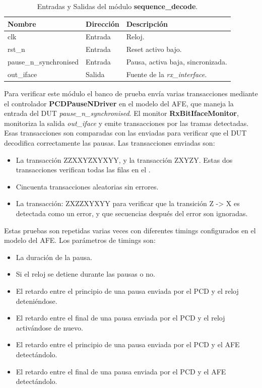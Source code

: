 \documentclass[a4paper, twoside, 11pt]{report}
\begin{document}
\begin{table}[htb]
  \centering
  \tablezebra
  \begin{tabulary}{\linewidth}{l|l|L}
    \textbf{Nombre}&\textbf{Dirección}&\textbf{Descripción} \\
    \hline
    clk&Entrada&Reloj. \\
    rst\_n&Entrada&Reset activo bajo. \\
    pause\_n\_synchronised &Entrada&Pausa, activa baja, sincronizada.\\
    out\_iface&Salida&Fuente de la \textit{rx\_interface}.\\
  \end{tabulary}
  \caption{Entradas y Salidas del módulo \textbf{sequence\_decode}.}
  \label{tab:ports_sequence_decode}
\end{table}

Para verificar este módulo el banco de prueba envía varias transacciones mediante el controlador \textbf{PCDPauseNDriver} en el modelo del AFE, que maneja la entrada del DUT \textit{pause\_n\_synchronised}. El monitor \textbf{RxBitIfaceMonitor}, monitoriza la salida \textit{out\_iface} y emite transacciones por las tramas detectadas. Esas transacciones son comparadas con las enviadas para verificar que el DUT decodifica correctamente las pausas. Las transacciones enviadas son:

\begin{itemize}
  \item La transacción ZZXXYZXYXYY, y la transacción ZXYZY. Estas dos transacciones verifican todas las filas en el .
  \item Cincuenta transacciones aleatorias sin errores.
  \item La transacción: ZXZZXYXYY para verificar que la transición Z -> X es detectada como un error, y que secuencias después del error son ignoradas.
\end{itemize}

Estas pruebas son repetidas varias veces con diferentes timings configurados en el modelo del AFE. Los parámetros de timings son:

\begin{itemize}
  \item La duración de la pausa.
  \item Si el reloj se detiene durante las pausas o no.
  \item El retardo entre el principio de una pausa enviada por el PCD y el reloj deteniéndose.
  \item El retardo entre el final de una pausa enviada por el PCD y el reloj activándose de nuevo.
  \item El retardo entre el principio de una pausa enviada por el PCD y el AFE detectándolo.
  \item El retardo entre el final de una pausa enviada por el PCD y el AFE detectándolo.
\end{itemize}
\end{document}
